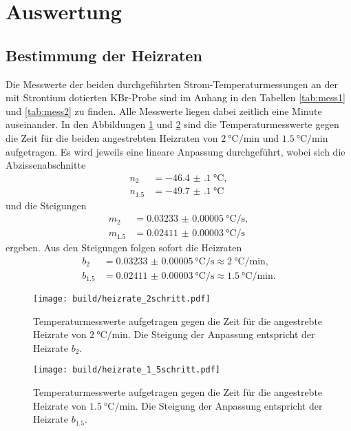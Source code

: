 \section{Auswertung}
\label{sec:Auswertung}

\subsection{Bestimmung der Heizraten}

Die Messwerte der beiden durchgeführten Strom-Temperaturmessungen an der mit
Strontium dotierten KBr-Probe sind im Anhang in den Tabellen \ref{tab:mess1}
und \ref{tab:mess2} zu finden. Alle Messwerte liegen dabei zeitlich eine Minute
auseinander. In den Abbildungen \ref{fig:heizrate2} und \ref{fig:heizrate15} sind
die Temperaturmesswerte gegen die Zeit für die beiden angestrebten Heizraten
von $\SI{2}{\celsius\per\minute}$ und $\SI{1.5}{\celsius\per\minute}$ aufgetragen.
Es wird jeweils eine lineare Anpassung durchgeführt, wobei sich die Abzissenabschnitte
\begin{align}
  n_{2} &= \SI{-46.4(1)}{\celsius},\\
  n_{1.5} &= \SI{-49.7(1)}{\celsius}
\end{align}
und die Steigungen
\begin{align}
  m_{2} &= \SI{0.03233(5)}{\celsius\per\second},\\
  m_{1.5} &= \SI{0.02411(3)}{\celsius\per\second}
\end{align}
ergeben. Aus den Steigungen folgen sofort die Heizraten
\begin{align}
  b_{2} &= \SI{0.03233(5)}{\celsius\per\second} \approx \SI{2}{\celsius\per\minute}, \\
  b_{1.5} &= \SI{0.02411(3)}{\celsius\per\second} \approx \SI{1.5}{\celsius\per\minute}.
  \label{eqn:heizrate}
\end{align}

\begin{figure}
  \centering
  \texttt{[image: build/heizrate\_2schritt.pdf]}
  \caption{Temperaturmesswerte aufgetragen gegen die Zeit für die angestrebte Heizrate von $\SI{2}{\celsius\per\minute}$. Die Steigung
  der Anpassung entspricht der Heizrate $b_{2}$.}
  \label{fig:heizrate2}
\end{figure}

\begin{figure}
  \centering
  \texttt{[image: build/heizrate\_1\_5schritt.pdf]}
  \caption{Temperaturmesswerte aufgetragen gegen die Zeit für die angestrebte Heizrate von $\SI{1.5}{\celsius\per\minute}$. Die Steigung
  der Anpassung entspricht der Heizrate $b_{1.5}$.}
  \label{fig:heizrate15}
\end{figure}

